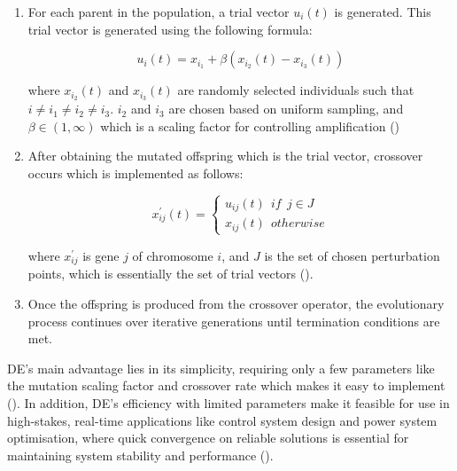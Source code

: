 \begin{enumerate}
	\item For each parent in the population, a trial vector $u_i(t)$ is generated. This trial vector is generated using the following formula:
	
	\begin{equation}
		u_i(t) = x_{i_1} + \beta(x_{i_2}(t) - x_{i_3}(t))
	\end{equation}

	where $x_{i_2}(t)$ and $x_{i_3}(t)$ are randomly selected individuals such that $i \neq i_1 \neq i_2 \neq i_3$. $i_2$ and  $i_3$ are chosen based on uniform sampling, and $\beta \in (1, \infty)$ which is a scaling factor for controlling amplification (\cite{storn1995differential})

	\item After obtaining the mutated offspring which is the trial vector, crossover occurs which is implemented as follows:
	
	\begin{equation}
		x_{ij}^{'}(t) =
		\begin{cases}
			u_{ij}(t) \:\: if \:\: j\in J \\ 
			x_{ij}(t) \:\: otherwise
		\end{cases}
	\end{equation}

	where $x_{ij}^{'}$ is gene $j$ of chromosome $i$, and $J$ is the set of chosen perturbation points, which is essentially the set of trial vectors (\cite{storn1995differential}).
	
	\item Once the offspring is produced from the crossover operator, the evolutionary process continues over iterative generations until termination conditions are met. \bigskip
\end{enumerate}

\noindent DE's main advantage lies in its simplicity, requiring only a few parameters like the mutation scaling factor and crossover rate which makes it easy to implement (\cite{storn1995differential}). In addition, DE's efficiency with limited parameters make it feasible for use in high-stakes, real-time applications like control system design and power system optimisation, where quick convergence on reliable solutions is essential for maintaining system stability and performance (\cite{das2010differential}). \bigskip

